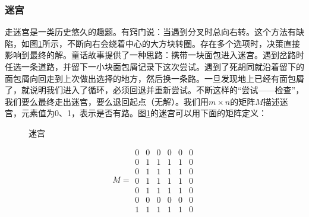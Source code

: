 \documentclass[b5paper]{ctexart}
\begin{document}
\subsubsection{迷宫}
走迷宫是一类历史悠久的趣题。有窍门说：当遇到分叉时总向右转。这个方法有缺陷，如图\ref{fig:maze-loop}所示，不断向右会绕着中心的大方块转圈。存在多个选项时，决策直接影响到最终的解。童话故事提供了一种思路：携带一块面包进入迷宫。遇到岔路时任选一条道路，并留下一小块面包屑记录下这次尝试。遇到了死胡同就沿着留下的面包屑向回走到上次做出选择的地方，然后换一条路。一旦发现地上已经有面包屑了，就说明我们进入了循环，必须回退并重新尝试。不断这样的“尝试——检查”，我们要么最终走出迷宫，要么退回起点（无解）。我们用$m \times n$的矩阵$M$描述迷宫，元素值为0、1，表示是否有路。图\ref{fig:maze-loop}的迷宫可以用下面的矩阵定义：

\begin{figure}[htbp]
 \centering
 \caption{迷宫}
 \label{fig:maze-loop}
\end{figure}

\[
M = \begin{matrix}
0 & 0 & 0 & 0 & 0 & 0 \\
0 & 1 & 1 & 1 & 1 & 0 \\
0 & 1 & 1 & 1 & 1 & 0 \\
0 & 1 & 1 & 1 & 1 & 0 \\
0 & 1 & 1 & 1 & 1 & 0 \\
0 & 0 & 0 & 0 & 0 & 0 \\
1 & 1 & 1 & 1 & 1 & 0
\end{matrix}
\]
\end{document}
